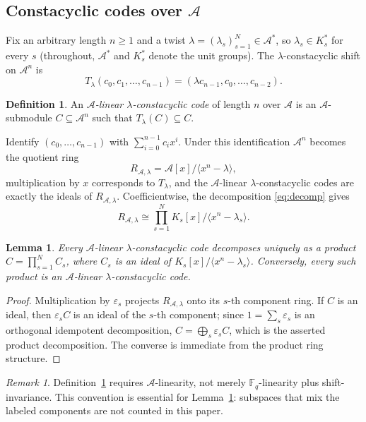 \documentclass[preprint,12pt,a4paper]{elsarticle}
\newcommand{\F}{\mathbb F}
\newcommand{\A}{\mathcal A}
\newtheorem{lemma}[theorem]{Lemma}
\theoremstyle{definition}
\newtheorem{definition}[theorem]{Definition}
\theoremstyle{remark}
\newtheorem{remark}[theorem]{Remark}
\begin{document}
\subsection{Constacyclic codes over \texorpdfstring{$\A$}{A}}\label{sec:codes}

Fix an arbitrary length $n\geq1$ and a twist
$\lambda=(\lambda_s)_{s=1}^{N}\in\A^\ast$, so $\lambda_s\in K_s^\ast$ for every
$s$ (throughout, $\A^\ast$ and $K_s^\ast$ denote the unit groups).  The $\lambda$-constacyclic shift on $\A^n$ is
\[
T_\lambda(c_0,c_1,\ldots,c_{n-1})
   =(\lambda c_{n-1},c_0,\ldots,c_{n-2}).
\]

\begin{definition}\label{def:constacyclic}
An \emph{$\A$-linear $\lambda$-constacyclic code} of length $n$ over $\A$ is an
$\A$-submodule $C\subseteq\A^n$ such that $T_\lambda(C)\subseteq C$.
\end{definition}

Identify $(c_0,\ldots,c_{n-1})$ with $\sum_{i=0}^{n-1}c_ix^i$.  Under this
identification $\A^n$ becomes the quotient ring
\[
R_{\A,\lambda}=\A[x]/\langle x^n-\lambda\rangle,
\]
multiplication by $x$ corresponds to $T_\lambda$, and the $\A$-linear
$\lambda$-constacyclic codes are exactly the ideals of $R_{\A,\lambda}$.
Coefficientwise, the decomposition \eqref{eq:decomp} gives
\[
R_{\A,\lambda}\cong\prod_{s=1}^{N}K_s[x]/\langle x^n-\lambda_s\rangle .
\]

\begin{lemma}\label{lem:components}
Every $\A$-linear $\lambda$-constacyclic code decomposes uniquely as a product
$C=\prod_{s=1}^{N}C_s$, where $C_s$ is an ideal of
$K_s[x]/\langle x^n-\lambda_s\rangle$.  Conversely, every such product is an
$\A$-linear $\lambda$-constacyclic code.
\end{lemma}

\begin{proof}
Multiplication by $\varepsilon_s$ projects $R_{\A,\lambda}$ onto its $s$-th
component ring.  If $C$ is an ideal, then $\varepsilon_s C$ is an ideal of the
$s$-th component; since $1=\sum_s\varepsilon_s$ is an orthogonal idempotent
decomposition, $C=\bigoplus_s\varepsilon_s C$, which is the asserted product
decomposition.  The converse is immediate from the product ring structure.
\end{proof}

\begin{remark}\label{rem:Alinear}
Definition~\ref{def:constacyclic} requires $\A$-linearity, not merely
$\F_q$-linearity plus shift-invariance.  This convention is essential for
Lemma~\ref{lem:components}: subspaces that mix the labeled components are
not counted in this paper.
\end{remark}
\end{document}
